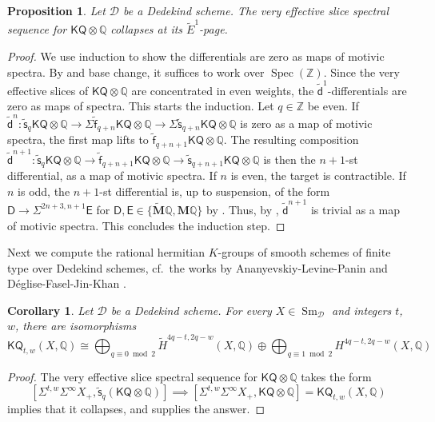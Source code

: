 \documentclass[11pt,hyp,english]{article}
\newcommand{\D}{\mathsf{D}}
\newcommand{\E}{\mathsf{E}}
\newcommand{\Z}{\mathbb{Z}}
\newcommand{\Q}{\mathbb{Q}}
\newcommand{\KQ}{\mathsf{KQ}}
\newcommand{\GW}{\mathsf{GW}}
\newcommand{\HQ}{\mathbf{M}\Q}
\newcommand{\cHQ}{{\wt{\mathbf{M}}}{\Q}}
\newcommand{\Sm}{\operatorname{Sm}}
\newcommand{\tensor}{\otimes}
\newcommand{\Spec}{\operatorname{Spec}}
\newcommand{\wt}[1]{\widetilde{#1}}
\newcommand{\vs}{\tilde{\mathsf{s}}}
\newcommand{\vf}{\tilde{{\mathsf{f}}}}
\newcommand{\vd}{{\tilde{\mathsf{d}}}}
\newtheorem{proposition}[theorem]{Proposition}
\newtheorem{corollary}[theorem]{Corollary}
\theoremstyle{definition}
\begin{document}
\begin{proposition}
\label{proposition:vessscollapse}
Let $\mathcal{D}$ be a Dedekind scheme.
The very effective slice spectral sequence for $\KQ\tensor\Q$ collapses at its $\tilde{E}^1$-page.
\end{proposition}
\begin{proof}
We use induction to show the differentials are zero as maps of motivic spectra.
By  and base change, 
it suffices to work over $\Spec(\Z)$.
Since the very effective slices of $\KQ\tensor \Q$ are concentrated in even weights, the $\vd^1$-differentials are zero as maps of spectra.
This starts the induction. 
Let $q\in \Z$ be even.
If $\vd^n\colon \vs_q\KQ\tensor \Q \to \Sigma \vf_{q+n}\KQ\tensor \Q \to \Sigma\vs_{q+n}\KQ\tensor \Q$ is zero as a map of motivic spectra, the first map lifts to $\vf_{q+n+1}\KQ\tensor \Q$.
The resulting composition
$\vd^{n+1}\colon \vs_q\KQ\tensor \Q\to \vf_{q+n+1}\KQ\otimes \Q\to \vs_{q+n+1}\KQ\otimes \Q$ is then the $n+1$-st differential, as a map of motivic spectra.
If $n$ is even, the target is contractible.
If $n$ is odd, the $n+1$-st differential is, up to suspension, of the form
$\D\to\Sigma^{2n+3,n+1}\E$ for $\D,\E\in \{\cHQ,\HQ\}$ by .
Thus, by , $\vd^{n+1}$ is trivial as a map of motivic spectra.
This concludes the induction step.
\end{proof}

Next we compute the rational hermitian $K$-groups of smooth schemes of finite type over Dedekind schemes, 
cf.~the works by Ananyevskiy-Levine-Panin \cite[Corollary 3.5]{ALP} and 
D{\'e}glise-Fasel-Jin-Khan \cite[Theorem 2.3]{Borel-iso}.

\begin{corollary}
\label{corollary:rationalhermitianKgroups}
Let $\mathcal{D}$ be a Dedekind scheme.
For every $X\in \Sm_{\mathcal{D}}$ and integers $t$, $w$, there are isomorphisms
\[
\KQ_{t,w}(X,\Q) 
\cong 
\bigoplus_{q \equiv 0 \bmod 2} \widetilde{H}^{4q-t,2q-w}(X,\Q) 
\oplus 
\bigoplus_{q \equiv 1 \bmod 2} H^{4q-t,2q-w}(X,\Q)
\]
\end{corollary}
\begin{proof}
The very effective slice spectral sequence for $\KQ\tensor\Q$ takes the form
\[
[\Sigma^{t,w}\Sigma^\infty X_+, \vs_{q}(\KQ\tensor\Q)] \implies 
[\Sigma^{t,w}\Sigma^\infty X_+, \KQ\tensor{\Q}] = \KQ_{t,w}(X,\Q)
\]
 implies that it collapses, and  supplies the answer.
\end{proof}
\end{document}
